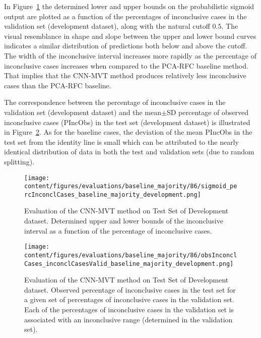 In Figure~\ref{fig:baseline_majority_percInconclCases_development} the determined lower and upper bounds on the 
probabilistic sigmoid output are plotted as a function of the percentages of inconclusive cases 
in the validation set (development dataset), along with the natural cutoff $0.5$.
The visual resemblance in shape and slope between the upper and lower bound curves 
indicates a similar distribution of predictions both below and above the cutoff.
The width of the inconclusive interval increases more rapidly as the percentage of inconclusive cases increases 
when compared to the PCA-RFC baseline method.
That implies that the CNN-MVT method produces relatively less inconclusive cases than the PCA-RFC baseline.


The correspondence between the percentage of inconclusive cases in the validation set (development dataset) and 
the mean$\pm$SD percentage of observed inconclusive cases (PIncObs) in the test set (development dataset) 
is illustrated in Figure~\ref{fig:obsInconclCases_inconclCasesValid_baseline_majority_development}.
As for the baseline cases, the deviation of the mean PIncObs in the test set from the 
identity line is small which can be attributed to the nearly identical distribution of data in both the test and validation sets 
(due to random splitting).


\begin{figure}[ht]
  \centering
  \texttt{[image: content/figures/evaluations/baseline\_majority/86/sigmoid\_percInconclCases\_baseline\_majority\_development.png]}
  \caption{Evaluation of the CNN-MVT method on Test Set of Development dataset. 
  Determined upper and lower bounds of the inconclusive interval as a function of the percentage of inconclusive cases.} 
  \label{fig:baseline_majority_percInconclCases_development}
\end{figure}


\begin{figure}[ht]
  \centering
  \texttt{[image: content/figures/evaluations/baseline\_majority/86/obsInconclCases\_inconclCasesValid\_baseline\_majority\_development.png]}
  \caption{Evaluation of the CNN-MVT method on Test Set of Development dataset.
  Observed percentage of inconclusive cases in the test set 
  for a given set of percentages of inconclusive cases in the validation set.
  Each of the percentages of inconclusive cases in the validation set is associated 
  with an inconclusive range (determined in the validation set).} 
  \label{fig:obsInconclCases_inconclCasesValid_baseline_majority_development}
\end{figure} 


